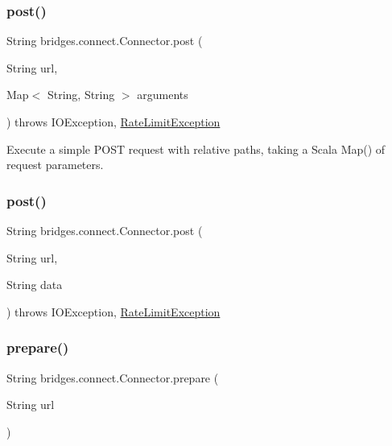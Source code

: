 \subsubsection{\texorpdfstring{post()}{post()}\hspace{0.1cm}{\footnotesize\ttfamily [1/2]}}
{\footnotesize\ttfamily String bridges.\+connect.\+Connector.\+post (\begin{DoxyParamCaption}\item[{String}]{url,  }\item[{Map$<$ String, String $>$}]{arguments }\end{DoxyParamCaption}) throws I\+O\+Exception, \mbox{\hyperlink{classbridges_1_1validation_1_1_rate_limit_exception}{Rate\+Limit\+Exception}}}

Execute a simple P\+O\+ST request with relative paths, taking a Scala Map() of request parameters. \mbox{\label{classbridges_1_1connect_1_1_connector_a4b8978743a8c230b86500f5a00cb2697}} 
\subsubsection{\texorpdfstring{post()}{post()}\hspace{0.1cm}{\footnotesize\ttfamily [2/2]}}
{\footnotesize\ttfamily String bridges.\+connect.\+Connector.\+post (\begin{DoxyParamCaption}\item[{String}]{url,  }\item[{String}]{data }\end{DoxyParamCaption}) throws I\+O\+Exception, 		\mbox{\hyperlink{classbridges_1_1validation_1_1_rate_limit_exception}{Rate\+Limit\+Exception}}}

\mbox{\label{classbridges_1_1connect_1_1_connector_a507ee5a9d8c812ffd4629cbd22f27373}} 
\subsubsection{\texorpdfstring{prepare()}{prepare()}}
{\footnotesize\ttfamily String bridges.\+connect.\+Connector.\+prepare (\begin{DoxyParamCaption}\item[{String}]{url }\end{DoxyParamCaption})}

